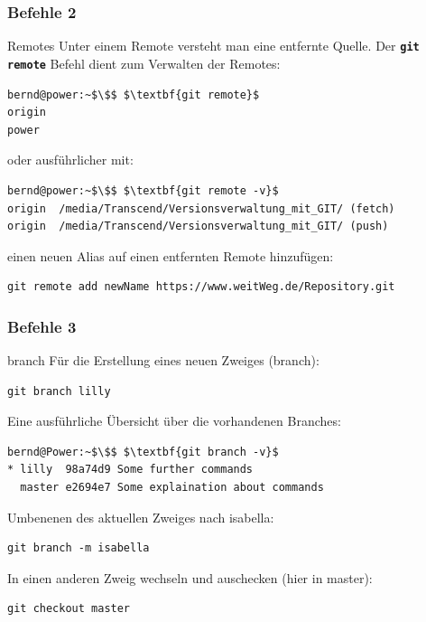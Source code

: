 \documentclass{beamer}
\begin{document}
\begin{frame}[fragile]\frametitle{Befehle 2}
\begin{block} {Remotes}
Unter einem Remote versteht man eine entfernte Quelle. Der \textbf{\lstinline|git remote|} Befehl dient zum Verwalten der Remotes:
\begin{lstlisting}[mathescape=true]
bernd@power:~$\$$ $\textbf{git remote}$
origin
power
\end{lstlisting}

oder ausführlicher mit:
\begin{lstlisting}[mathescape=true]
bernd@power:~$\$$ $\textbf{git remote -v}$
origin  /media/Transcend/Versionsverwaltung_mit_GIT/ (fetch)
origin  /media/Transcend/Versionsverwaltung_mit_GIT/ (push)
\end{lstlisting}

einen neuen Alias auf einen entfernten Remote hinzufügen:
\begin{lstlisting}
git remote add newName https://www.weitWeg.de/Repository.git
\end{lstlisting}
\end{block}
\end{frame}

\begin{frame}[fragile]\frametitle{Befehle 3}
\begin{block} {branch}
Für die Erstellung eines neuen Zweiges (branch):
\begin{lstlisting}
git branch lilly
\end{lstlisting}

Eine ausführliche Übersicht über die vorhandenen Branches:
\begin{lstlisting}[mathescape=true]
bernd@Power:~$\$$ $\textbf{git branch -v}$
* lilly  98a74d9 Some further commands
  master e2694e7 Some explaination about commands
\end{lstlisting} %

Umbenenen des aktuellen Zweiges nach isabella:
\begin{lstlisting}
git branch -m isabella
\end{lstlisting}

In einen anderen Zweig wechseln und auschecken (hier in master):
\begin{lstlisting}
git checkout master
\end{lstlisting}

\end{block}
\end{frame}
\end{document}
